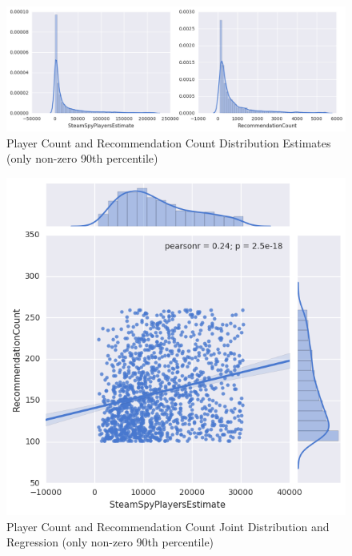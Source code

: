 \documentclass[10pt,journal,compsoc]{IEEEtran}
\begin{document}
\begin{figure}[p]
    \caption{Player Count and Recommendation Count Distribution Estimates (only non-zero 90th percentile) \label{fig:players-recommendations-dists}}
    \includegraphics[width=\textwidth,keepaspectratio]{player-count-recommends-distribution}
\end{figure}

\begin{figure}[p]
    \caption{Player Count and Recommendation Count Joint Distribution and Regression (only non-zero 90th percentile) \label{fig:players-recommendations-jointwithreg}}
    \includegraphics[width=\textwidth,keepaspectratio]{player-count-recommends-jointwithreg}
\end{figure}
\end{document}
